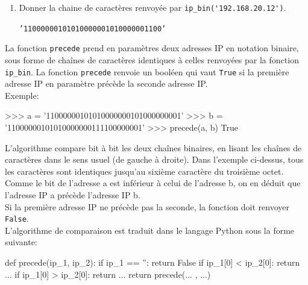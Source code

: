 \documentclass[11pt, a4paper]{report}
\begin{document}
    \medskip

    \begin{enumerate}[resume]
        \item Donner la chaine de caractères renvoyée par \verb|ip_bin('192.168.20.12')|.
        
                \begin{blocvisible}[height=1]
                 \texttt{'11000000101010000001010000001100'}  \end{blocvisible}

    \end{enumerate}

    \medskip

    La fonction \verb|precede| prend en paramètres deux adresses IP en notation binaire, sous forme de chaînes de caractères identiques à celles renvoyées par la fonction \verb|ip_bin|. La fonction \verb|precede| renvoie un booléen qui vaut \verb|True| si la première adresse IP en paramètre précède la seconde adresse IP.\\

Exemple:

\begin{CodePythontexAlt}[TaillePolice=\large, Largeur=1\linewidth,Centre,Lignes=true,PremLigne=1]{}

>>> a = '11000000101010000000101000000001' 
>>> b = '11000000101010000000111100000001' 
>>> precede(a, b) 
True
	\end{CodePythontexAlt}

    L'algorithme compare bit à bit les deux chaînes binaires, en lisant les chaînes de caractères dans le sens usuel (de gauche à droite). Dans l'exemple ci-dessus, tous les caractères sont identiques jusqu'au sixième caractère du troisième octet. Comme le bit de l'adresse a est inférieur à celui de l'adresse b, on en déduit que l'adresse IP a précède l'adresse IP b.\\

Si la première adresse IP ne précède pas la seconde, la fonction doit renvoyer \verb|False|.\\

L’algorithme de comparaison est traduit dans le langage Python sous la forme suivante:\\

\begin{CodePythontexAlt}[TaillePolice=\large, Largeur=1\linewidth,Centre,Lignes=true,PremLigne=1]{}

def precede(ip_1, ip_2):
    if ip_1 == '':
        return False
    if ip_1[0] < ip_2[0]:
        return ...
    if ip_1[0] > ip_2[0]:
        return ...
    return precede(... , ...)

	\end{CodePythontexAlt}
\end{document}
